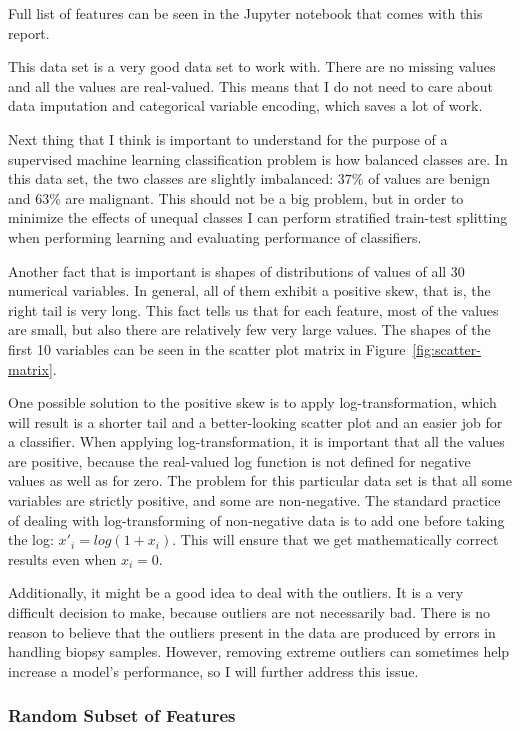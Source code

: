 \documentclass[10pt, a4paper]{article}
\begin{document}
Full list of features can be seen in the Jupyter notebook that comes with this report.

This data set is a very good data set to work with. There are no missing values and all the values are real-valued. This means that I do not need to care about data imputation and categorical variable encoding, which saves a lot of work.

Next thing that I think is important to understand for the purpose of a supervised machine learning classification problem is how balanced classes are. In this data set, the two classes are slightly imbalanced: $37\%$ of values are benign and $63\%$ are malignant. This should not be a big problem, but in order to minimize the effects of unequal classes I can perform stratified train-test splitting when performing learning and evaluating performance of classifiers.

Another fact that is important is shapes of distributions of values of all 30 numerical variables. In general, all of them exhibit a positive skew, that is, the right tail is very long. This fact tells us that for each feature, most of the values are small, but also there are relatively few very large values. The shapes of the first 10 variables can be seen in the scatter plot matrix in Figure~\ref{fig:scatter-matrix}. 

One possible solution to the positive skew is to apply log-transformation, which will result is a shorter tail and a better-looking scatter plot and an easier job for a classifier. When applying log-transformation, it is important that all the values are positive, because the real-valued log function is not defined for negative values as well as for zero. The problem for this particular data set is that all some variables are strictly positive, and some are non-negative. The standard practice of dealing with log-transforming of non-negative data is to add one before taking the log: $x'_i=log(1+x_i)$. This will ensure that we get mathematically correct results even when $x_i = 0$.

Additionally, it might be a good idea to deal with the outliers. It is a very difficult decision to make, because outliers are not necessarily bad. There is no reason to believe that the outliers present in the data are produced by errors in handling biopsy samples. However, removing extreme outliers can sometimes help increase a model's performance, so I will further address this issue.

\subsubsection{Random Subset of Features}
\end{document}
